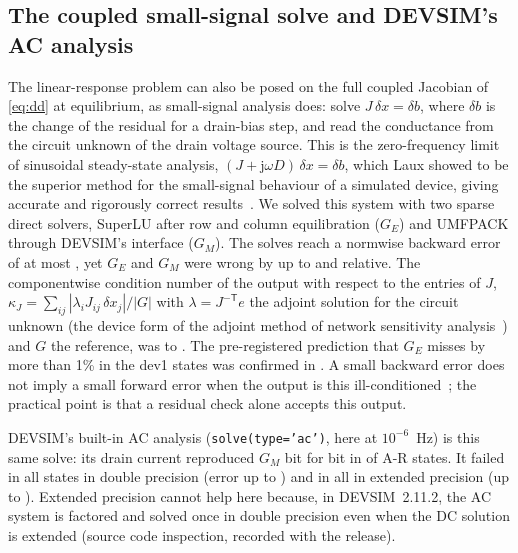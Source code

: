 \documentclass[11pt]{article}
\begin{document}
\subsection{The coupled small-signal solve and DEVSIM's AC analysis}\label{sec:ss}
The linear-response problem can also be posed on the full coupled Jacobian of \cref{eq:dd} at equilibrium, as
small-signal analysis does: solve $J\,\delta x = \delta b$, where $\delta b$ is the change of the residual for a drain-bias
step, and read the conductance from the circuit unknown of the drain voltage source. This is the zero-frequency limit of
sinusoidal steady-state analysis, $(J + \mathrm{j}\omega D)\,\delta x = \delta b$, which Laux showed to be the superior
method for the small-signal behaviour of a simulated device, giving accurate and rigorously correct results~\cite{Laux1985}. We solved this system with two sparse direct
solvers, SuperLU after row and column equilibration ($G_E$) and UMFPACK through DEVSIM's interface ($G_M$). The solves
reach a normwise backward error of at most \etaMax{}, yet $G_E$ and $G_M$ were wrong by up to \pssMaxGE{} and \pssMaxGM{}
relative. The componentwise condition number of the output with respect to the entries of $J$,
$\kappa_J = \sum_{ij}|\lambda_i J_{ij}\,\delta x_j|/|G|$ with $\lambda = J^{-\mathsf{T}}e$ the adjoint solution for the
circuit unknown (the device form of the adjoint method of network sensitivity analysis~\cite{GhioneFilicori1993}) and
$G$ the reference, was \xsKappaMin{} to \xsKappaMax{}. The pre-registered prediction that
$G_E$ misses by more than 1\% in the \pssPredicted{} dev1 states was confirmed in \pssConfirmed{}. A small backward error does
not imply a small forward error when the output is this ill-conditioned~\cite{Higham2002}; the practical point is that a
residual check alone accepts this output.

DEVSIM's built-in AC analysis (\texttt{solve(type='ac')}, here at $10^{-6}$~Hz) is this same solve: its drain current
reproduced $G_M$ bit for bit in \acBitwise{} of \acN{} A-R states. It failed in all \acN{} states in double precision
(error up to \acMaxDouble{}) and in all \acN{} in extended precision (up to \acMaxExt{}). Extended precision cannot help
here because, in DEVSIM~2.11.2, the AC system is factored and solved once in double precision even when the DC solution
is extended (source code inspection, recorded with the release).
\end{document}
